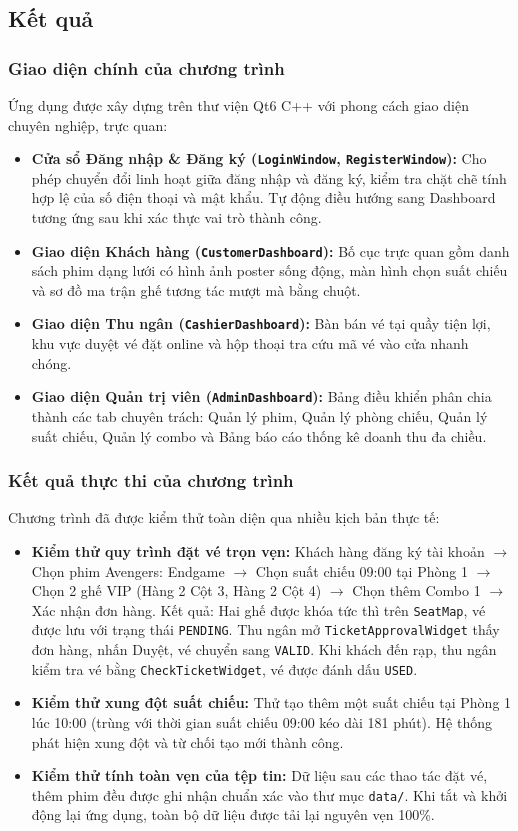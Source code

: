 \documentclass[12pt,a4paper]{article}
\begin{document}
\subsection{Kết quả}

\subsubsection{Giao diện chính của chương trình}
Ứng dụng được xây dựng trên thư viện Qt6 C++ với phong cách giao diện chuyên nghiệp, trực quan:
\begin{itemize}
    \item \textbf{Cửa sổ Đăng nhập \& Đăng ký (\texttt{LoginWindow}, \texttt{RegisterWindow}):} Cho phép chuyển đổi linh hoạt giữa đăng nhập và đăng ký, kiểm tra chặt chẽ tính hợp lệ của số điện thoại và mật khẩu. Tự động điều hướng sang Dashboard tương ứng sau khi xác thực vai trò thành công.
    \item \textbf{Giao diện Khách hàng (\texttt{CustomerDashboard}):} Bố cục trực quan gồm danh sách phim dạng lưới có hình ảnh poster sống động, màn hình chọn suất chiếu và sơ đồ ma trận ghế tương tác mượt mà bằng chuột.
    \item \textbf{Giao diện Thu ngân (\texttt{CashierDashboard}):} Bàn bán vé tại quầy tiện lợi, khu vực duyệt vé đặt online và hộp thoại tra cứu mã vé vào cửa nhanh chóng.
    \item \textbf{Giao diện Quản trị viên (\texttt{AdminDashboard}):} Bảng điều khiển phân chia thành các tab chuyên trách: Quản lý phim, Quản lý phòng chiếu, Quản lý suất chiếu, Quản lý combo và Bảng báo cáo thống kê doanh thu đa chiều.
\end{itemize}

\subsubsection{Kết quả thực thi của chương trình}
Chương trình đã được kiểm thử toàn diện qua nhiều kịch bản thực tế:
\begin{itemize}
    \item \textbf{Kiểm thử quy trình đặt vé trọn vẹn:} Khách hàng đăng ký tài khoản $\rightarrow$ Chọn phim Avengers: Endgame $\rightarrow$ Chọn suất chiếu 09:00 tại Phòng 1 $\rightarrow$ Chọn 2 ghế VIP (Hàng 2 Cột 3, Hàng 2 Cột 4) $\rightarrow$ Chọn thêm Combo 1 $\rightarrow$ Xác nhận đơn hàng. Kết quả: Hai ghế được khóa tức thì trên \texttt{SeatMap}, vé được lưu với trạng thái \texttt{PENDING}. Thu ngân mở \texttt{TicketApprovalWidget} thấy đơn hàng, nhấn Duyệt, vé chuyển sang \texttt{VALID}. Khi khách đến rạp, thu ngân kiểm tra vé bằng \texttt{CheckTicketWidget}, vé được đánh dấu \texttt{USED}.
    \item \textbf{Kiểm thử xung đột suất chiếu:} Thử tạo thêm một suất chiếu tại Phòng 1 lúc 10:00 (trùng với thời gian suất chiếu 09:00 kéo dài 181 phút). Hệ thống phát hiện xung đột và từ chối tạo mới thành công.
    \item \textbf{Kiểm thử tính toàn vẹn của tệp tin:} Dữ liệu sau các thao tác đặt vé, thêm phim đều được ghi nhận chuẩn xác vào thư mục \texttt{data/}. Khi tắt và khởi động lại ứng dụng, toàn bộ dữ liệu được tải lại nguyên vẹn 100\%.
\end{itemize}
\end{document}
